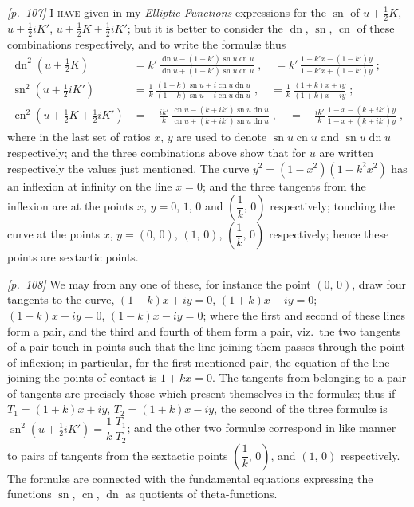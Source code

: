 \documentclass[11pt,a4paper]{article}
\theoremstyle{plain}
\theoremstyle{definition}
\theoremstyle{remark}
\DeclareMathOperator{\sn}{sn}
\DeclareMathOperator{\cn}{cn}
\DeclareMathOperator{\dn}{dn}
\begin{document}
\noindent\textit{[p.~107]} \textsc{I have} given in my \textit{Elliptic Functions} expressions for the $\sn$ of $u + \tfrac{1}{2}K$, $u + \tfrac{1}{2}iK'$, $u + \tfrac{1}{2}K + \tfrac{1}{2}iK'$; but it is better to consider the $\dn$, $\sn$, $\cn$ of these combinations respectively, and to write the formul\ae{} thus
\begin{align*}
\dn^2(u + \tfrac{1}{2}K) &= k'\,\frac{\dn u - (1 - k')\sn u\cn u}{\dn u + (1 - k')\sn u\cn u}\;,\quad
= k'\,\frac{1 - k'x - (1 - k')y}{1 - k'x + (1 - k')y}\;;\\[0.4em]
\sn^2(u + \tfrac{1}{2}iK') &= \frac{1}{k}\,\frac{(1 + k)\sn u + i\cn u\dn u}{(1 + k)\sn u - i\cn u\dn u}\;,\quad
= \frac{1}{k}\,\frac{(1 + k)x + iy}{(1 + k)x - iy}\;;\\[0.4em]
\cn^2(u + \tfrac{1}{2}K + \tfrac{1}{2}iK') &= -\,\frac{ik'}{k}\,\frac{\cn u - (k + ik')\sn u\dn u}{\cn u + (k + ik')\sn u\dn u}\;,\quad
= -\,\frac{ik'}{k}\,\frac{1 - x - (k + ik')y}{1 - x + (k + ik')y}\;,
\end{align*}
where in the last set of ratios $x$, $y$ are used to denote $\sn u\cn u$ and $\sn u\dn u$ respectively; and the three combinations above show that for $u$ are written respectively the values just mentioned. The curve $y^2 = (1 - x^2)(1 - k^2 x^2)$ has an inflexion at infinity on the line $x = 0$; and the three tangents from the inflexion are at the points $x$, $y = 0$, $1$, $0$ and $\left(\dfrac{1}{k},\,0\right)$ respectively; touching the curve at the points $x$, $y = (0,\,0)$, $(1,\,0)$, $\left(\dfrac{1}{k},\,0\right)$ respectively; hence these points are sextactic points.

\bigskip\noindent\textit{[p.~108]} We may from any one of these, for instance the point $(0,\,0)$, draw four tangents to the curve, $(1 + k)x + iy = 0$, $(1 + k)x - iy = 0$; $(1 - k)x + iy = 0$, $(1 - k)x - iy = 0$; where the first and second of these lines form a pair, and the third and fourth of them form a pair, viz.\ the two tangents of a pair touch in points such that the line joining them passes through the point of inflexion; in particular, for the first-mentioned pair, the equation of the line joining the points of contact is $1 + kx = 0$. The tangents from belonging to a pair of tangents are precisely those which present themselves in the formul\ae{}; thus if $T_1 = (1 + k)x + iy$, $T_2 = (1 + k)x - iy$, the second of the three formul\ae{} is $\sn^2(u + \tfrac{1}{2}iK') = \dfrac{1}{k}\,\dfrac{T_1}{T_2}$; and the other two formul\ae{} correspond in like manner to pairs of tangents from the sextactic points $\left(\dfrac{1}{k},\,0\right)$, and $(1,\,0)$ respectively. The formul\ae{} are connected with the fundamental equations expressing the functions $\sn$, $\cn$, $\dn$ as quotients of theta-functions.
\end{document}

